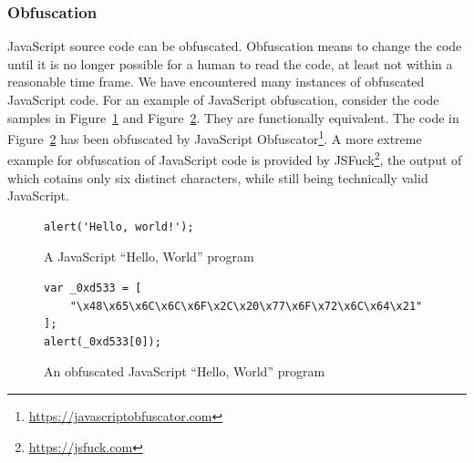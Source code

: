 \documentclass[
    fontsize=12pt,
    headings=small,
    parskip=half,
    bibliography=totoc,
    numbers=noenddot,
    open=any
    ]{scrreprt}
\begin{document}
\subsubsection{Obfuscation}
\label{fundamentals:obfuscation}
JavaScript source code can be obfuscated. Obfuscation means to change the code
until it is no longer possible for a human to read the code, at least not within
a reasonable time frame. We have encountered many instances of obfuscated JavaScript
code. For an example of JavaScript obfuscation, consider the code samples in
Figure~\ref{code:javascript_hello_world} and Figure~\ref{code:javascript_obfuscated}.
They are functionally equivalent. The code in Figure~\ref{code:javascript_obfuscated}
has been obfuscated by JavaScript Obfuscator\footnote{\url{https://javascriptobfuscator.com}}.
A more extreme example for obfuscation of JavaScript code is provided by JSFuck\footnote{\url{https://jsfuck.com}},
the output of which cotains only six distinct characters, while still being technically valid JavaScript.

\begin{figure}
\centering
\begin{verbatim}
alert('Hello, world!');
\end{verbatim}
\caption{A JavaScript ``Hello, World'' program}
\label{code:javascript_hello_world}
\end{figure}

\begin{figure}
\centering
\begin{verbatim}
var _0xd533 = [
    "\x48\x65\x6C\x6C\x6F\x2C\x20\x77\x6F\x72\x6C\x64\x21"
];
alert(_0xd533[0]);
\end{verbatim}
\caption{An obfuscated JavaScript ``Hello, World'' program}
\label{code:javascript_obfuscated}
\end{figure}
\end{document}
